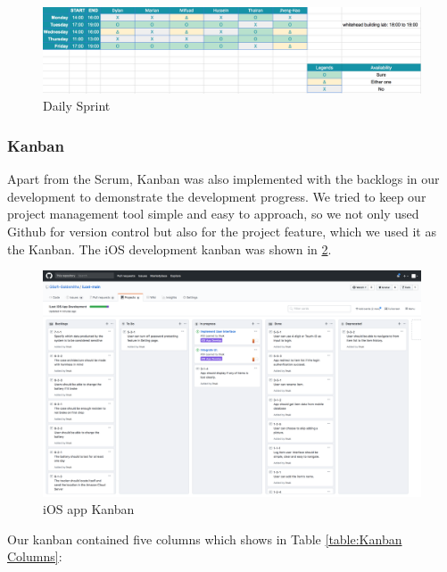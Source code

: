 \documentclass[12pt,a4paper]{article}
\begin{document}
          \begin{figure}[H]
            \centering
            \includegraphics[width=1\textwidth]{../assets/development-records-daily-sprint.png}
            \caption{Daily Sprint}
            \label{fig:Daily Sprint}
          \end{figure}

        \subsubsection{Kanban}
          Apart from the Scrum, Kanban was also implemented with the backlogs in our development to demonstrate the development progress. We tried to keep our project management tool simple and easy to approach, so we not only used Github for version control but also for the project feature, which we used it as the Kanban. The iOS  development kanban was shown in \ref{fig:iOS Development Kanban}.

          \begin{figure}[H]
            \centering
            \includegraphics[width=1\textwidth]{../assets/development-records-ios-kanban.png}
            \caption{iOS app Kanban}
            \label{fig:iOS Development Kanban}
          \end{figure}
         
          Our kanban contained five columns which shows in Table \ref{table:Kanban Columns}:
          
\end{document}

